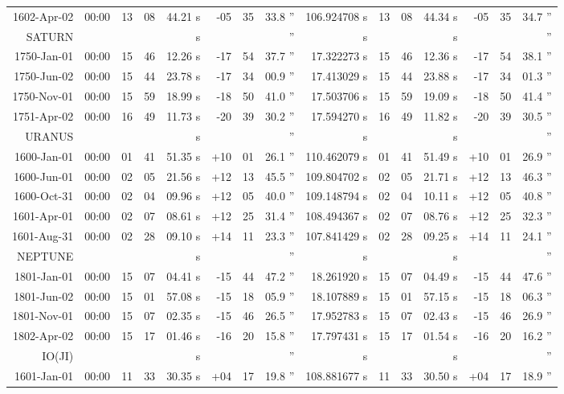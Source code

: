 \begin{longtable}{r@{\,}r|r@{h}r@{m}r<{s}|r@{°}r@{'}r<{''}|r<{s}||r@{h}r@{m}r<{s}|r@{°}r@{'}r<{''}}
 1602-Apr-02 &00:00   &  13 & 08 & 44.21 & -05 & 35 & 33.8  &   106.924708 & 13&08&44.34 & -05&35&34.7 \\ %
SATURN\\ 
 1750-Jan-01 &00:00   &  15 & 46 & 12.26 & -17 & 54 & 37.7  &    17.322273 & 15&46&12.36 & -17&54&38.1 \\ %
 1750-Jun-02 &00:00   &  15 & 44 & 23.78 & -17 & 34 & 00.9  &    17.413029 & 15&44&23.88 & -17&34&01.3 \\ %
 1750-Nov-01 &00:00   &  15 & 59 & 18.99 & -18 & 50 & 41.0  &    17.503706 & 15&59&19.09 & -18&50&41.4 \\ %
 1751-Apr-02 &00:00   &  16 & 49 & 11.73 & -20 & 39 & 30.2  &    17.594270 & 16&49&11.82 & -20&39&30.5 \\ %
URANUS\\  
 1600-Jan-01 &00:00   &  01 & 41 & 51.35 & +10 & 01 & 26.1  &   110.462079 & 01&41&51.49 & +10&01&26.9 \\ %
 1600-Jun-01 &00:00   &  02 & 05 & 21.56 & +12 & 13 & 45.5  &   109.804702 & 02&05&21.71 & +12&13&46.3 \\ %
 1600-Oct-31 &00:00   &  02 & 04 & 09.96 & +12 & 05 & 40.0  &   109.148794 & 02&04&10.11 & +12&05&40.8 \\ %
 1601-Apr-01 &00:00   &  02 & 07 & 08.61 & +12 & 25 & 31.4  &   108.494367 & 02&07&08.76 & +12&25&32.3 \\ %
 1601-Aug-31 &00:00   &  02 & 28 & 09.10 & +14 & 11 & 23.3  &   107.841429 & 02&28&09.25 & +14&11&24.1 \\ %
NEPTUNE\\ 
 1801-Jan-01 &00:00   &  15 & 07 & 04.41 & -15 & 44 & 47.2  &    18.261920 & 15&07&04.49 & -15&44&47.6 \\ %
 1801-Jun-02 &00:00   &  15 & 01 & 57.08 & -15 & 18 & 05.9  &    18.107889 & 15&01&57.15 & -15&18&06.3 \\ %
 1801-Nov-01 &00:00   &  15 & 07 & 02.35 & -15 & 46 & 26.5  &    17.952783 & 15&07&02.43 & -15&46&26.9 \\ %
 1802-Apr-02 &00:00   &  15 & 17 & 01.46 & -16 & 20 & 15.8  &    17.797431 & 15&17&01.54 & -16&20&16.2 \\ %
IO(JI)\\   
 1601-Jan-01 &00:00   &  11 & 33 & 30.35 & +04 & 17 & 19.8  &   108.881677 & 11&33&30.50 & +04&17&18.9 \\ %

\end{longtable}
